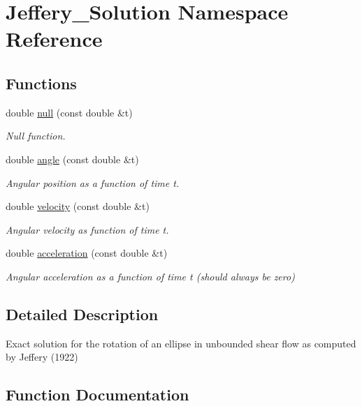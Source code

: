 \hypertarget{namespaceJeffery__Solution}{}\section{Jeffery\+\_\+\+Solution Namespace Reference}
\label{namespaceJeffery__Solution}
\subsection*{Functions}
\begin{DoxyCompactItemize}
\item 
double \hyperlink{namespaceJeffery__Solution_a6a47b12e9a89f545c7467fae2e6a4350}{null} (const double \&t)
\begin{DoxyCompactList}\small\item\em Null function. \end{DoxyCompactList}\item 
double \hyperlink{namespaceJeffery__Solution_ad3bd18834ecba370674e34242f8125c1}{angle} (const double \&t)
\begin{DoxyCompactList}\small\item\em Angular position as a function of time t. \end{DoxyCompactList}\item 
double \hyperlink{namespaceJeffery__Solution_acf35d547e7d28609a17c66c9a191090b}{velocity} (const double \&t)
\begin{DoxyCompactList}\small\item\em Angular velocity as function of time t. \end{DoxyCompactList}\item 
double \hyperlink{namespaceJeffery__Solution_afe09bdca1fe833f94f510e206d5df08c}{acceleration} (const double \&t)
\begin{DoxyCompactList}\small\item\em Angular acceleration as a function of time t (should always be zero) \end{DoxyCompactList}\end{DoxyCompactItemize}


\subsection{Detailed Description}
Exact solution for the rotation of an ellipse in unbounded shear flow as computed by Jeffery (1922) 

\subsection{Function Documentation}
\mbox{\label{namespaceJeffery__Solution_afe09bdca1fe833f94f510e206d5df08c}} 

